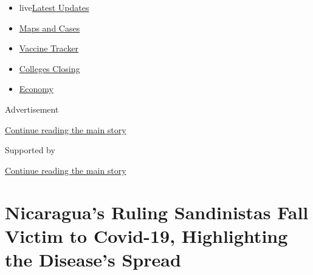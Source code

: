 \begin{itemize}
\tightlist
\item
  live\href{https://www.nytimes3xbfgragh.onion/2020/08/20/world/coronavirus-covid.html?name=styln-coronavirus-national\&region=TOP_BANNER\&variant=undefined\&block=storyline_menu_recirc\&action=click\&pgtype=Article\&impression_id=174f1411-e387-11ea-bbe1-53730119d2f5}{Latest
  Updates}
\item
  \href{https://www.nytimes3xbfgragh.onion/interactive/2020/us/coronavirus-us-cases.html?name=styln-coronavirus-national\&region=TOP_BANNER\&variant=undefined\&block=storyline_menu_recirc\&action=click\&pgtype=Article\&impression_id=174f1412-e387-11ea-bbe1-53730119d2f5}{Maps
  and Cases}
\item
  \href{https://www.nytimes3xbfgragh.onion/interactive/2020/science/coronavirus-vaccine-tracker.html?name=styln-coronavirus-national\&region=TOP_BANNER\&variant=undefined\&block=storyline_menu_recirc\&action=click\&pgtype=Article\&impression_id=174f1413-e387-11ea-bbe1-53730119d2f5}{Vaccine
  Tracker}
\item
  \href{https://www.nytimes3xbfgragh.onion/2020/08/19/us/colleges-closing-covid.html?name=styln-coronavirus-national\&region=TOP_BANNER\&variant=undefined\&block=storyline_menu_recirc\&action=click\&pgtype=Article\&impression_id=174f1414-e387-11ea-bbe1-53730119d2f5}{Colleges
  Closing}
\item
  \href{https://www.nytimes3xbfgragh.onion/live/2020/08/20/business/stock-market-today-coronavirus?name=styln-coronavirus-national\&region=TOP_BANNER\&variant=undefined\&block=storyline_menu_recirc\&action=click\&pgtype=Article\&impression_id=174f1415-e387-11ea-bbe1-53730119d2f5}{Economy}
\end{itemize}

Advertisement

\protect\hyperlink{after-top}{Continue reading the main story}

Supported by

\protect\hyperlink{after-sponsor}{Continue reading the main story}

\hypertarget{nicaraguas-ruling-sandinistas-fall-victim-to-covid-19-highlighting-the-diseases-spread}{%
\section{Nicaragua's Ruling Sandinistas Fall Victim to Covid-19,
Highlighting the Disease's
Spread}\label{nicaraguas-ruling-sandinistas-fall-victim-to-covid-19-highlighting-the-diseases-spread}}


